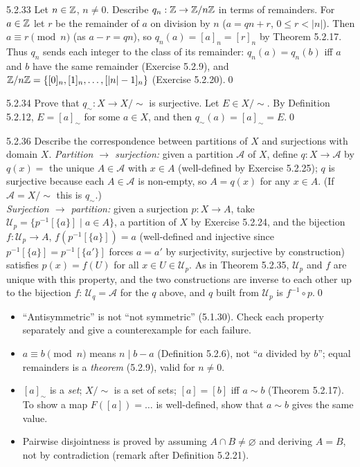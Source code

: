 \begin{bookex}[essential]{5.2.33}
Let $n\in\mathbb{Z}$, $n\ne0$. Describe $q_n:\mathbb{Z}\to\mathbb{Z}/n\mathbb{Z}$ in terms of remainders.
\solution
For $a\in\mathbb{Z}$ let $r$ be the remainder of $a$ on division by $n$ ($a=qn+r$, $0\le r<|n|$). Then $a\equiv r\pmod n$ (as $a-r=qn$), so $q_n(a)=[a]_n=[r]_n$ by Theorem 5.2.17. Thus $q_n$ sends each integer to the class of its remainder: $q_n(a)=q_n(b)$ iff $a$ and $b$ have the same remainder (Exercise 5.2.9), and $\mathbb{Z}/n\mathbb{Z}=\{[0]_n,[1]_n,\dots,[|n|-1]_n\}$ (Exercise 5.2.20).\qed
\end{bookex}

\begin{bookex}[recommended]{5.2.34}
Prove that $q_\sim:X\to X/{\sim}$ is surjective.
\solution
Let $E\in X/{\sim}$. By Definition 5.2.12, $E=[a]_\sim$ for some $a\in X$, and then $q_\sim(a)=[a]_\sim=E$.\qed
\end{bookex}

\begin{bookex}[recommended]{5.2.36}
Describe the correspondence between partitions of $X$ and surjections with domain $X$.
\solution
\emph{Partition $\to$ surjection:} given a partition $\mathcal A$ of $X$, define $q:X\to\mathcal A$ by $q(x)=$ the unique $A\in\mathcal A$ with $x\in A$ (well-defined by Exercise 5.2.25); $q$ is surjective because each $A\in\mathcal A$ is non-empty, so $A=q(x)$ for any $x\in A$. (If $\mathcal A=X/{\sim}$ this is $q_\sim$.)\\
\emph{Surjection $\to$ partition:} given a surjection $p:X\to A$, take $\mathcal U_p=\{p^{-1}[\{a\}]\mid a\in A\}$, a partition of $X$ by Exercise 5.2.24, and the bijection $f:\mathcal U_p\to A$, $f(p^{-1}[\{a\}])=a$ (well-defined and injective since $p^{-1}[\{a\}]=p^{-1}[\{a'\}]$ forces $a=a'$ by surjectivity, surjective by construction) satisfies $p(x)=f(U)$ for all $x\in U\in\mathcal U_p$. As in Theorem 5.2.35, $\mathcal U_p$ and $f$ are unique with this property, and the two constructions are inverse to each other up to the bijection $f$: $\mathcal U_q=\mathcal A$ for the $q$ above, and $q$ built from $\mathcal U_p$ is $f^{-1}\circ p$.\qed
\end{bookex}

\begin{warn}
\begin{itemize}
\item ``Antisymmetric'' is not ``not symmetric'' (5.1.30). Check each property separately and give a counterexample for each failure.
\item $a\equiv b\pmod n$ means $n\mid b-a$ (Definition 5.2.6), not ``$a$ divided by $b$''; equal remainders is a \emph{theorem} (5.2.9), valid for $n\ne0$.
\item $[a]_\sim$ is a \emph{set}; $X/{\sim}$ is a set of sets; $[a]=[b]$ iff $a\sim b$ (Theorem 5.2.17). To show a map $F([a])=\dots$ is well-defined, show that $a\sim b$ gives the same value.
\item Pairwise disjointness is proved by assuming $A\cap B\ne\varnothing$ and deriving $A=B$, not by contradiction (remark after Definition 5.2.21).
\end{itemize}
\end{warn}

